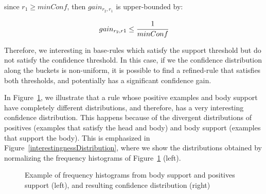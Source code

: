 since $r_1 \geq minConf$, then $gain_{r_2,r_1}$ is upper-bounded by:

\begin{equation}
 gain_{r_2,r1} \leq \cfrac{1}{minConf}
\end{equation}

Therefore, we interesting in base-rules which satisfy the support threshold but do not satisfy the
confidence threshold. In this case, if we the confidence distribution along the buckets is non-uniform, it is possible
to find a refined-rule that satisfies both thresholds, and potentially has a significant confidence gain.

In Figure~\ref{interestingnessExample}, we illustrate that a rule whose positive examples and body
support have completely different distributions, and therefore, has a very interesting confidence distribution. This
happens because of the divergent distributions of positives (examples that satisfy the head
and body) and body support (examples that support the body). This is emphasized in
Figure~\ref{interestingnessDistribution}, where we show the distributions obtained by normalizing the frequency
histograms of Figure~\ref{interestingnessExample} (left).

\begin{figure} [h!]
  \caption{Example of frequency histograms from body support and positives support (left), and resulting confidence
distribution (right)}
  \label{interestingnessExample} 
\end{figure}


